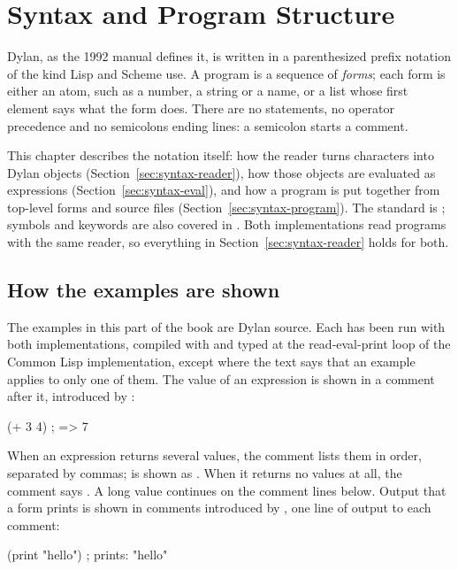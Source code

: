 \chapter{Syntax and Program Structure}\label{ch:syntax}

Dylan, as the 1992 manual defines it, is written in a parenthesized prefix
notation of the kind Lisp and Scheme use. A program is a sequence of
\emph{forms}; each form is either an atom, such as a number, a string or a
name, or a list whose first element says what the form does. There are no
statements, no operator precedence and no semicolons ending lines: a
semicolon starts a comment.

This chapter describes the notation itself: how the reader turns
characters into Dylan objects (Section~\ref{sec:syntax-reader}), how those objects
are evaluated as expressions (Section~\ref{sec:syntax-eval}), and how a program is
put together from top-level forms and source files
(Section~\ref{sec:syntax-program}). The standard is ;
symbols and keywords are also covered in . Both
implementations read programs with the same reader, so everything in
Section~\ref{sec:syntax-reader} holds for both.

\section{How the examples are shown}\label{sec:syntax-conventions}

The examples in this part of the book are Dylan source. Each has been run
with both implementations, compiled with  and typed at the
read-eval-print loop of the Common Lisp implementation, except where the
text says that an example applies to only one of them. The value of an
expression is shown in a comment after it, introduced by \code{=>}:

\begin{dylan}
(+ 3 4)                 ; => 7
\end{dylan}

\noindent When an expression returns several values, the comment lists them
in order, separated by commas;  is shown as
. When it returns no values at all, the comment says
. A long value continues on the comment lines below. Output that a form prints is shown in comments
introduced by , one line of output to each comment:

\begin{dylan}
(print "hello")         ; prints: "hello"
\end{dylan}

